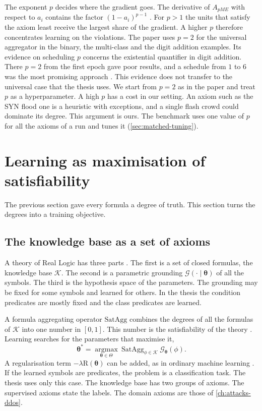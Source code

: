 The exponent $p$ decides where the gradient goes. The derivative of $A_{pME}$
with respect to $a_i$ contains the factor $(1-a_i)^{p-1}$
\citep{badreddine2022ltn}. For $p>1$ the units that satisfy the axiom least
receive the largest share of the gradient. A higher $p$ therefore concentrates
learning on the violations. The paper uses $p=2$ for the universal aggregator
in the binary, the multi-class and the digit addition examples. Its evidence on
scheduling $p$ concerns the existential quantifier in digit addition. There
$p=2$ from the first epoch gave poor results, and a schedule from $1$ to $6$
was the most promising approach \citep{badreddine2022ltn}. This evidence does
not transfer to the universal case that the thesis uses. We start from $p=2$
as in the paper and treat $p$ as a hyperparameter. A high $p$ has a cost in
our setting. An axiom such as the SYN flood one is a heuristic with
exceptions, and a single flash crowd could dominate its degree. This
argument is ours.
The benchmark uses one value of $p$ for all the axioms of a run and tunes it
(\cref{sec:matched-tuning}).

\section{Learning as maximisation of satisfiability}
\label{sec:learning-satisfiability}

The previous section gave every formula a degree of truth. This section turns
the degrees into a training objective.

\subsection{The knowledge base as a set of axioms}
\label{sec:knowledge-base}

A theory of Real Logic has three parts \citep{badreddine2022ltn}. The first is
a set of closed formulas, the knowledge base $\mathcal{K}$. The second is a
parametric grounding $\mathcal{G}(\cdot\mid\boldsymbol{\theta})$ of all the
symbols. The third is the hypothesis space of the parameters. The grounding
may be fixed for some symbols and learned for others. In the thesis the
condition predicates are mostly fixed and the class predicates are learned.

A formula aggregating operator $\mathrm{SatAgg}$ combines the degrees of all the
formulas of $\mathcal{K}$ into one number in $[0,1]$. This number is the
satisfiability of the theory \citep{badreddine2022ltn}. Learning searches for
the parameters that maximise it,
\[
\boldsymbol{\theta}^{*}=\operatorname*{argmax}_{\boldsymbol{\theta}\in\Theta}
\ \mathrm{SatAgg}_{\phi\in\mathcal{K}}\ \mathcal{G}_{\boldsymbol{\theta}}(\phi).
\]
A regularisation term $-\lambda\mathrm{R}(\boldsymbol{\theta})$ can be added,
as in ordinary machine learning \citep{badreddine2022ltn}. If the learned
symbols are predicates, the problem is a classification task. The thesis uses
only this case. The knowledge base has two groups of axioms. The supervised
axioms state the labels. The domain axioms are those of
\cref{ch:attacks-ddos}.

